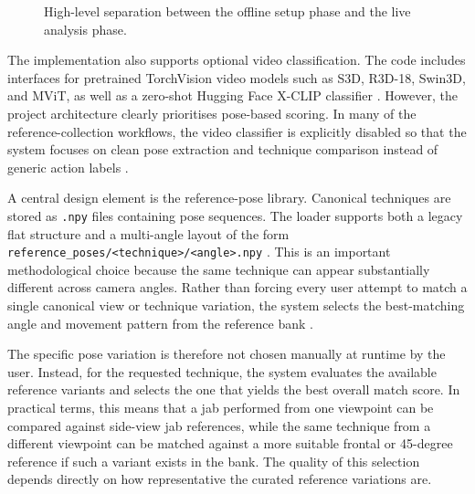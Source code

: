 \documentclass[12pt]{article}
\begin{document}
\begin{figure}[H]
\centering
{}
\caption{High-level separation between the offline setup phase and the live analysis phase.}
\label{fig:system_pipeline}
\end{figure}

The implementation also supports optional video classification. The code includes interfaces for pretrained TorchVision video models such as S3D, R3D-18, Swin3D, and MViT, as well as a zero-shot Hugging Face X-CLIP classifier \cite{projectActionRecognition}. However, the project architecture clearly prioritises pose-based scoring. In many of the reference-collection workflows, the video classifier is explicitly disabled so that the system focuses on clean pose extraction and technique comparison instead of generic action labels \cite{projectFrontKickLog,projectSeedLog}.

A central design element is the reference-pose library. Canonical techniques are stored as \texttt{.npy} files containing pose sequences. The loader supports both a legacy flat structure and a multi-angle layout of the form \texttt{reference\_poses/<technique>/<angle>.npy} \cite{projectActionRecognition,projectReadme}. This is an important methodological choice because the same technique can appear substantially different across camera angles. Rather than forcing every user attempt to match a single canonical view or technique variation, the system selects the best-matching angle and movement pattern from the reference bank \cite{projectActionRecognition}.

The specific pose variation is therefore not chosen manually at runtime by the user. Instead, for the requested technique, the system evaluates the available reference variants and selects the one that yields the best overall match score. In practical terms, this means that a jab performed from one viewpoint can be compared against side-view jab references, while the same technique from a different viewpoint can be matched against a more suitable frontal or 45-degree reference if such a variant exists in the bank. The quality of this selection depends directly on how representative the curated reference variations are.
\end{document}
